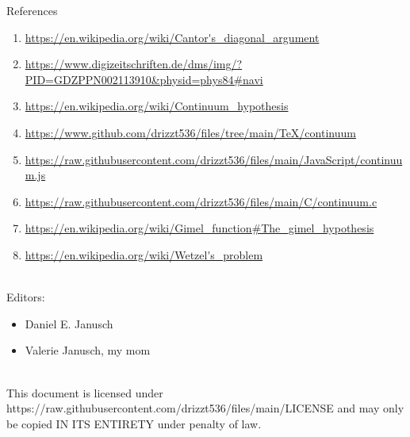 \documentclass[12pt]{article}
\begin{document}
\pagebreak\begin{section}{References}\label{sec:references}
	\begin{enumerate}
		\item\url{https://en.wikipedia.org/wiki/Cantor's\_diagonal\_argument}\\
		\label{ref:diagonal argument}

		\item\url{https://www.digizeitschriften.de/dms/img/?PID=GDZPPN002113910&physid=phys84#navi}\\
		\label{ref:cantor-1891}

		\item\url{https://en.wikipedia.org/wiki/Continuum\_hypothesis}\\
		\label{ref:continuum}

		\item\url{https://www.github.com/drizzt536/files/tree/main/TeX/continuum}\\
		\label{ref:files}

		\item\url{https://raw.githubusercontent.com/drizzt536/files/main/JavaScript/continuum.js}\\
		\label{ref:js-code}

		\item\url{https://raw.githubusercontent.com/drizzt536/files/main/C/continuum.c}\\
		\label{ref:c-code}

		\item\url{https://en.wikipedia.org/wiki/Gimel\_function\#The\_gimel\_hypothesis}\\
		\label{ref:gimel}

		\item\url{https://en.wikipedia.org/wiki/Wetzel's\_problem}\\
		\label{ref:wetzel}
	\end{enumerate}
	\vspace{1em}\\
	Editors:
	\begin{itemize}
		\item Daniel E. Janusch
		\item Valerie Janusch, my mom
	\end{itemize}
	\vspace{3em}\\
	This document is licensed under https://raw.githubusercontent.com/drizzt536/files/main/LICENSE
	and may only be copied IN ITS ENTIRETY under penalty of law.
\end{section}
\end{document}
